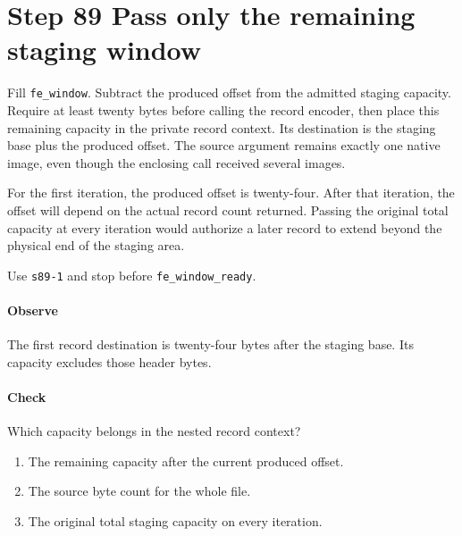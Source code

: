 \section{Step 89 Pass only the remaining staging window}
Fill \texttt{fe\_window}. Subtract the produced offset from the admitted staging capacity. Require at least twenty bytes before calling the record encoder, then place this remaining capacity in the private record context. Its destination is the staging base plus the produced offset. The source argument remains exactly one native image, even though the enclosing call received several images.

For the first iteration, the produced offset is twenty-four. After that iteration, the offset will depend on the actual record count returned. Passing the original total capacity at every iteration would authorize a later record to extend beyond the physical end of the staging area.

Use \texttt{s89-1} and stop before \texttt{fe\_window\_ready}.

\paragraph{Observe} The first record destination is twenty-four bytes after the staging base. Its capacity excludes those header bytes.

\paragraph{Check} Which capacity belongs in the nested record context?
\begin{enumerate}[label=\Alph*.]
  \item The remaining capacity after the current produced offset.
  \item The source byte count for the whole file.
  \item The original total staging capacity on every iteration.
\end{enumerate}
